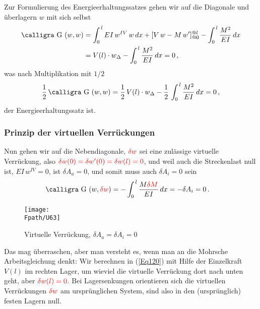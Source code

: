 {{{{Zur Formulierung des Energieerhaltungssatzes gehen wir auf die Diagonale und \"{u}berlagern $w$ mit sich selbst
\begin{align}
\text{\normalfont\calligra G\,\,}(w,w) &= \int_0^{\,l} EI\,w^{IV}\,w\,dx + [V\,w - M\,w']_{@0}^{@l} - \int_0^{\,l} \frac{M^2}{EI}\,dx \nn \\
&= V(l) \cdot w_{\Delta} - \int_0^{\,l} \frac{M^2}{EI}\,dx = 0\,,
\end{align}
was nach Multiplikation mit $1/2 $
\begin{align}
\frac{1}{2}\, \text{\normalfont\calligra G\,\,}(w,w) = \frac{1}{2}\,  V(l)\cdot w_{\Delta} - \frac{1}{2}\,\int_0^{\,l} \frac{M^2}{EI}\,dx = 0\,,
\end{align}
der Energieerhaltungssatz ist.

{\textcolor{sectionTitleBlue}{\subsubsection*{Prinzip der virtuellen Verr\"{u}ckungen}}}

Nun gehen wir auf die Nebendiagonale, $\textcolor{red}{\delta w}$ sei eine zul\"{a}ssige virtuelle Verr\"{u}ckung, also $\textcolor{red}{\delta w(0) = \delta w'(0) = \delta w(l) = 0}$, und weil auch die Streckenlast null ist, $EI\,w^{IV} = 0$, ist $\delta A_a = 0$, und somit muss auch $\delta A_i = 0$ sein
\begin{align}\label{Eq120}
\text{\normalfont\calligra G\,\,}(w, \textcolor{red}{\delta w}) &= - \int_0^{\,l} \frac{M \textcolor{red}{\delta M}}{EI}\,dx =  - \delta A_i = 0\,.
\end{align}
\begin{figure}[tbp]
\centering
\if {} \sidecaption \fi
\texttt{[image: \\Fpath/U63]}
\caption{Virtuelle Verr\"{u}ckung, $\delta A_a = \delta A_i = 0$} \label{U63}
\end{figure}%
Das mag \"{u}berraschen, aber man versteht es, wenn man an die Mohrsche Arbeitsgleichung denkt: Wir berechnen in (\ref{Eq120}) mit Hilfe der Einzelkraft $V(l)$ im rechten Lager, um wieviel die virtuelle Verr\"{u}ckung dort nach unten geht, aber $\textcolor{red}{\delta w(l) = 0}$. Bei Lagersenkungen orientieren sich die virtuellen Verr\"{u}ckungen $\textcolor{red}{\delta w}$ am urspr\"{u}nglichen System, sind also in den (urspr\"{u}nglich) festen Lagern null.


}}}}
